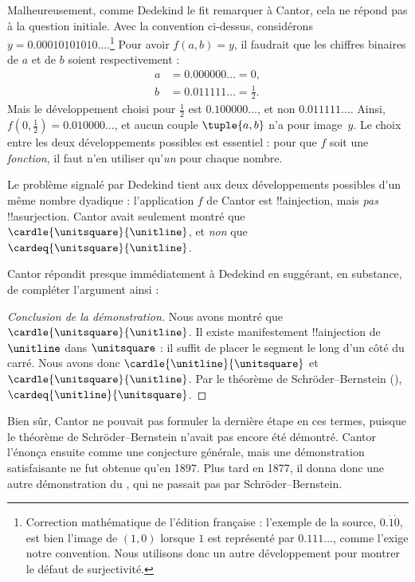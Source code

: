 \documentclass[../../../include/open-logic-section]{subfiles}
\begin{document}
Malheureusement, comme Dedekind le fit remarquer à Cantor, cela ne
répond pas à la question initiale. Avec la convention ci-dessus,
considérons $y=0.00010101010\ldots$.\footnote{
Correction mathématique de l'édition française : l'exemple de la
source, $0.\dot{1}\dot{0}$, est bien l'image de $(1,0)$ lorsque
$1$ est représenté par $0.111\ldots$, comme l'exige notre convention.
Nous utilisons donc un autre développement pour montrer le défaut
de surjectivité.}
Pour avoir $f(a,b)=y$, il faudrait que les chiffres binaires
de $a$ et de $b$ soient respectivement :
\begin{align*}
a&=0.000000\ldots=0,\\
b&=0.011111\ldots=\tfrac{1}{2}.
\end{align*}
Mais le développement choisi pour $\tfrac{1}{2}$ est
$0.100000\ldots$, et non $0.011111\ldots$. Ainsi,
$f(0,\tfrac{1}{2})=0.010000\ldots$, et aucun couple
$\tuple{a,b}$ n'a pour image~$y$. Le choix entre les deux
développements possibles est essentiel : pour que $f$ soit une
\emph{fonction}, il faut n'en utiliser qu'\emph{un} pour chaque
nombre.

Le problème signalé par Dedekind tient aux deux développements
possibles d'un même nombre dyadique : l'application $f$
de Cantor est !!a{injection}, mais \emph{pas} !!a{surjection}.
Cantor avait seulement montré que
$\cardle{\unitsquare}{\unitline}$, et \emph{non} que
$\cardeq{\unitsquare}{\unitline}$.

Cantor répondit presque immédiatement à Dedekind en suggérant,
en substance, de compléter l'argument ainsi :

\begin{proof}[Conclusion de la démonstration]
Nous avons montré que $\cardle{\unitsquare}{\unitline}$.
Il existe manifestement !!a{injection} de $\unitline$ dans
$\unitsquare$ : il suffit de placer le segment le long d'un côté
du carré. Nous avons donc $\cardle{\unitline}{\unitsquare}$ et
$\cardle{\unitsquare}{\unitline}$. Par le théorème de
Schr\"{o}der--Bernstein
(),
$\cardeq{\unitline}{\unitsquare}$.
\end{proof}

Bien sûr, Cantor ne pouvait pas formuler la dernière étape en ces
termes, puisque le théorème de Schr\"{o}der--Bernstein n'avait
pas encore été démontré. Cantor l'énonça ensuite comme une
conjecture générale, mais une démonstration satisfaisante ne fut
obtenue qu'en 1897. Plus tard en 1877, il donna donc une autre
démonstration du , qui ne passait pas par
Schr\"{o}der--Bernstein.
\end{document}
